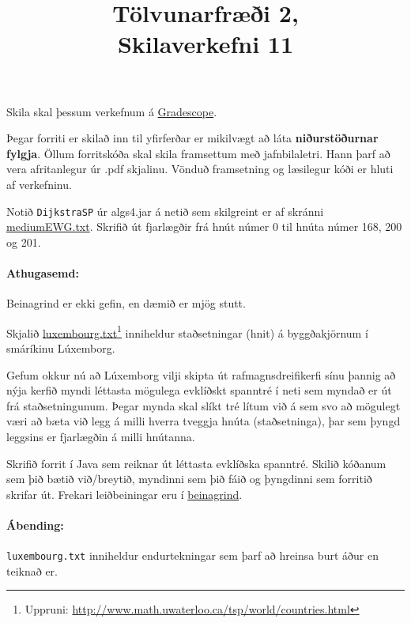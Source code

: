 \documentclass{article}
\title{Tölvunarfræði 2, \semester \\ Skilaverkefni 11}
\author{}
\begin{document}
\maketitle
{}

Skila skal þessum verkefnum á \href{https://gradescope.com/courses/14122}{Gradescope}.

Þegar forriti er skilað inn til yfirferðar er mikilvægt að láta \textbf{niðurstöðurnar fylgja}. Öllum forritskóða skal skila framsettum með jafnbilaletri. Hann þarf að vera afritanlegur úr .pdf skjalinu. Vönduð framsetning og læsilegur kóði er hluti af verkefninu.

\question
Notið \texttt{DijkstraSP} úr algs4.jar á netið sem skilgreint er af skránni \href{https://algs4.cs.princeton.edu/43mst/mediumEWG.txt}{mediumEWG.txt}. Skrifið út fjarlægðir frá hnút númer 0 til hnúta númer 168, 200 og 201.

\paragraph{Athugasemd:} Beinagrind er ekki gefin, en dæmið er mjög stutt.

\question
Skjalið \href{https://github.com/Ernir/kennsluefni/tree/master/T2/Code/w11/luxembourg.txt}{luxembourg.txt}\footnote{Uppruni: \url{http://www.math.uwaterloo.ca/tsp/world/countries.html}} inniheldur staðsetningar (hnit) á byggðakjörnum í smáríkinu Lúxemborg.

Gefum okkur nú að Lúxemborg vilji skipta út rafmagnsdreifikerfi sínu þannig að nýja kerfið myndi léttasta mögulega evklíðskt spanntré  í neti sem myndað er út frá staðsetningunum. Þegar mynda skal slíkt tré lítum við á sem svo að mögulegt væri að bæta við legg á milli hverra tveggja hnúta (staðsetninga), þar sem þyngd leggsins er fjarlægðin á milli hnútanna.

Skrifið forrit í Java sem reiknar út léttasta evklíðska spanntré. Skilið kóðanum sem þið bætið við/breytið, myndinni sem þið fáið og þyngdinni sem forritið skrifar út. Frekari leiðbeiningar eru í \href{https://github.com/Ernir/kennsluefni/tree/master/T2/Code/w11/EuclideanMST.java}{beinagrind}.

\paragraph{Ábending:} \texttt{luxembourg.txt} inniheldur endurtekningar sem þarf að hreinsa burt áður en teiknað er.
\end{document}
